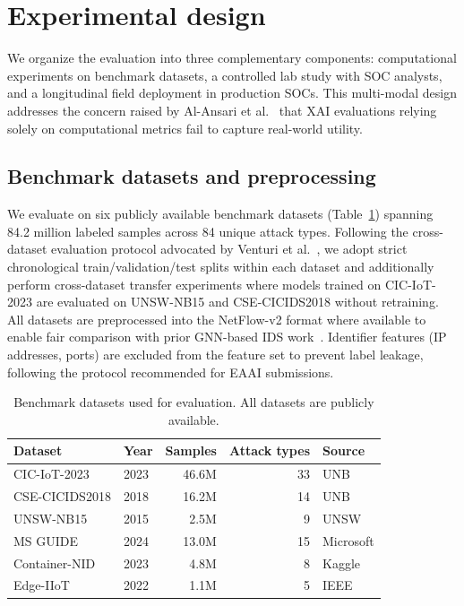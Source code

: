 \documentclass[preprint,review,12pt]{elsarticle}
\begin{document}
\section{Experimental design}
\label{sec:experimental_setup}

We organize the evaluation into three complementary components: computational experiments on benchmark datasets, a controlled lab study with SOC analysts, and a longitudinal field deployment in production SOCs. This multi-modal design addresses the concern raised by Al-Ansari et al.~\cite{al_ansari_xai_eval_2024} that XAI evaluations relying solely on computational metrics fail to capture real-world utility.

\subsection{Benchmark datasets and preprocessing}

We evaluate on six publicly available benchmark datasets (Table~\ref{tab:datasets}) spanning 84.2 million labeled samples across 84 unique attack types. Following the cross-dataset evaluation protocol advocated by Venturi et al.~\cite{venturi_cross_dataset_2024}, we adopt strict chronological train/validation/test splits within each dataset and additionally perform cross-dataset transfer experiments where models trained on CIC-IoT-2023 are evaluated on UNSW-NB15 and CSE-CICIDS2018 without retraining. All datasets are preprocessed into the NetFlow-v2 format where available to enable fair comparison with prior GNN-based IDS work~\cite{te_gsage_2025}. Identifier features (IP addresses, ports) are excluded from the feature set to prevent label leakage, following the protocol recommended for EAAI submissions.

\begin{table}[!t]
\centering
\caption{Benchmark datasets used for evaluation. All datasets are publicly available.}
\label{tab:datasets}
\begin{tabular}{@{}llrrl@{}}
\toprule
\textbf{Dataset} & \textbf{Year} & \textbf{Samples} & \textbf{Attack types} & \textbf{Source} \\
\midrule
CIC-IoT-2023 & 2023 & 46.6M & 33 & UNB \\
CSE-CICIDS2018 & 2018 & 16.2M & 14 & UNB \\
UNSW-NB15 & 2015 & 2.5M & 9 & UNSW \\
MS GUIDE & 2024 & 13.0M & 15 & Microsoft \\
Container-NID & 2023 & 4.8M & 8 & Kaggle \\
Edge-IIoT & 2022 & 1.1M & 5 & IEEE \\
\bottomrule
\end{tabular}
\end{table}
\end{document}
